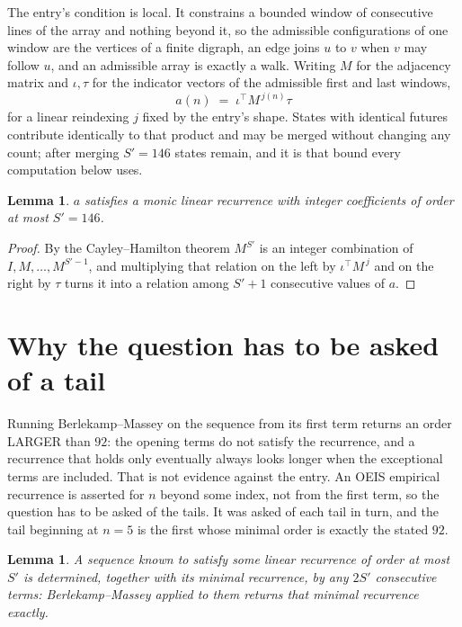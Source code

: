 \documentclass[11pt,a4paper]{article}
\theoremstyle{plain}
\newtheorem{lemma}[theorem]{Lemma}
\theoremstyle{definition}
\begin{document}
The entry's condition is local. It constrains a bounded window of consecutive lines of the
array and nothing beyond it, so the admissible configurations of one window are the vertices of
a finite digraph, an edge joins $u$ to $v$ when $v$ may follow $u$, and an admissible array is
exactly a walk. Writing $M$ for the adjacency matrix and $\iota,\tau$ for the indicator vectors
of the admissible first and last windows,
\[
a(n)\;=\;\iota^{\!\top}M^{\,j(n)}\tau
\]
for a linear reindexing $j$ fixed by the entry's shape. States with identical futures
contribute identically to that product and may be merged without changing any count; after
merging $S'=146$ states remain, and it is that bound every computation below uses.

\begin{lemma}\label{lem:cf}
$a$ satisfies a monic linear recurrence with integer coefficients of order at most $S'=146$.
\end{lemma}

\begin{proof}
By the Cayley--Hamilton theorem $M^{S'}$ is an integer combination of $I,M,\dots,M^{S'-1}$,
and multiplying that relation on the left by $\iota^{\!\top}M^{\,j}$ and on the right by
$\tau$ turns it into a relation among $S'+1$ consecutive values of $a$.
\end{proof}

\section{Why the question has to be asked of a tail}

Running Berlekamp--Massey on the sequence from its first term returns an order LARGER than $92$: the opening terms do not satisfy the recurrence, and a recurrence that holds only eventually always looks longer when the exceptional terms are included. That is not evidence against the entry. An OEIS empirical recurrence is asserted for $n$ beyond some index, not from the first term, so the question has to be asked of the tails. It was asked of each tail in turn, and the tail beginning at $n=5$ is the first whose minimal order is exactly the stated $92$.

\begin{lemma}\label{lem:bm}
A sequence known to satisfy some linear recurrence of order at most $S'$ is determined,
together with its minimal recurrence, by any $2S'$ consecutive terms: Berlekamp--Massey applied
to them returns that minimal recurrence exactly.
\end{lemma}
\end{document}
